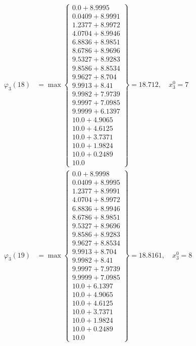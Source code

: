 \documentclass{article}
\begin{document}
\begin{align*}
\varphi_{3}(18) &= \max \left\{ \begin{array}{c}
0.0 + 8.9995 \\
 0.0409 + 8.9991 \\
 1.2377 + 8.9972 \\
 4.0704 + 8.9946 \\
 6.8836 + 8.9851 \\
 8.6786 + 8.9696 \\
 9.5327 + 8.9283 \\
 9.8586 + 8.8534 \\
 9.9627 + 8.704 \\
 9.9913 + 8.41 \\
 9.9982 + 7.9739 \\
 9.9997 + 7.0985 \\
 9.9999 + 6.1397 \\
 10.0 + 4.9065 \\
 10.0 + 4.6125 \\
 10.0 + 3.7371 \\
 10.0 + 1.9824 \\
 10.0 + 0.2489 \\
 10.0
\end{array} \right\}=18.712, \quad x_{3}^0=7\\
  
\varphi_{3}(19) &= \max \left\{ \begin{array}{c}
0.0 + 8.9998 \\
 0.0409 + 8.9995 \\
 1.2377 + 8.9991 \\
 4.0704 + 8.9972 \\
 6.8836 + 8.9946 \\
 8.6786 + 8.9851 \\
 9.5327 + 8.9696 \\
 9.8586 + 8.9283 \\
 9.9627 + 8.8534 \\
 9.9913 + 8.704 \\
 9.9982 + 8.41 \\
 9.9997 + 7.9739 \\
 9.9999 + 7.0985 \\
 10.0 + 6.1397 \\
 10.0 + 4.9065 \\
 10.0 + 4.6125 \\
 10.0 + 3.7371 \\
 10.0 + 1.9824 \\
 10.0 + 0.2489 \\
 10.0
\end{array} \right\}=18.8161, \quad x_{3}^0=8\\
  

\end{align*}
\end{document}
